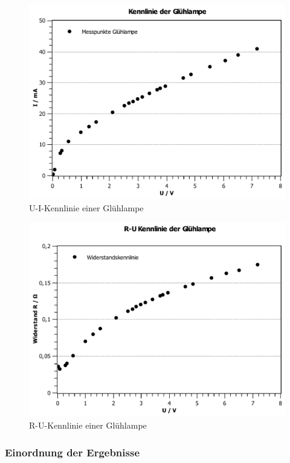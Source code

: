 \documentclass[11pt,a4paper,titlepage, ngerman]{article}
\begin{document}
				\begin{figure}
					\centering
					\includegraphics[width=\textwidth]{KennlinieGluehlampe.pdf}
					\caption{U-I-Kennlinie einer Glühlampe}
					\label{KL c}
				\end{figure}
				\begin{figure}
					\centering
					\includegraphics[width=\textwidth]{KennlinieGluehlampeWiderstand.pdf}
					\caption{R-U-Kennlinie einer Glühlampe}
					\label{R c}
				\end{figure}
			
			\subsubsection*{Einordnung der Ergebnisse}
						
\end{document}
